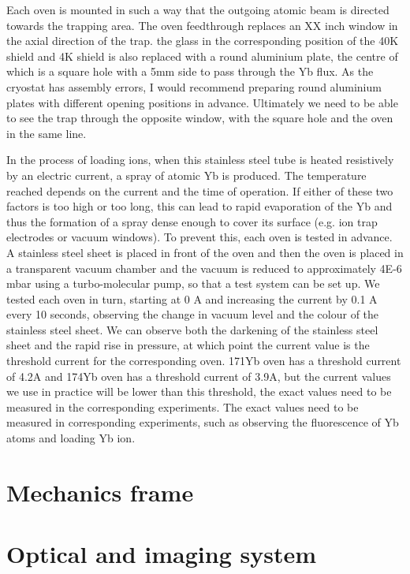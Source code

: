 Each oven is mounted in such a way that the outgoing atomic beam is directed towards the trapping area. The oven feedthrough replaces an XX inch window in the axial direction of the trap. the glass in the corresponding position of the 40K shield and 4K shield is also replaced with a round aluminium plate, the centre of which is a square hole with a 5mm side to pass through the Yb flux. As the cryostat has assembly errors, I would recommend preparing round aluminium plates with different opening positions in advance. Ultimately we need to be able to see the trap through the opposite window, with the square hole and the oven in the same line.

In the process of loading ions, when this stainless steel tube is heated resistively by an electric current, a spray of atomic Yb is produced. The temperature reached depends on the current and the time of operation. If either of these two factors is too high or too long, this can lead to rapid evaporation of the Yb and thus the formation of a spray dense enough to cover its surface (e.g. ion trap electrodes or vacuum windows). To prevent this, each oven is tested in advance. A stainless steel sheet is placed in front of the oven and then the oven is placed in a transparent vacuum chamber and the vacuum is reduced to approximately 4E-6 mbar using a turbo-molecular pump, so that a test system can be set up. We tested each oven in turn, starting at 0 A and increasing the current by 0.1 A every 10 seconds, observing the change in vacuum level and the colour of the stainless steel sheet. We can observe both the darkening of the stainless steel sheet and the rapid rise in pressure, at which point the current value is the threshold current for the corresponding oven. 171Yb oven has a threshold current of 4.2A and 174Yb oven has a threshold current of 3.9A, but the current values we use in practice will be lower than this threshold, the exact values need to be measured in the corresponding experiments. The exact values need to be measured in corresponding experiments, such as observing the fluorescence of Yb atoms and loading Yb ion.



\section{Mechanics frame}



\section{Optical and imaging system}

